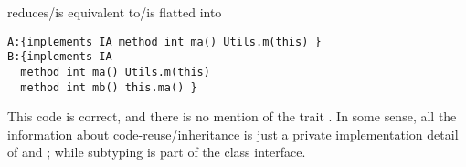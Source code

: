 \noindent reduces/is equivalent to/is flatted into
  
 \begin{lstlisting}
A:{implements IA method int ma() Utils.m(this) }
B:{implements IA
  method int ma() Utils.m(this)
  method int mb() this.ma() } 

 \end{lstlisting}
 
 This code is correct, and there is no mention of the trait
 \Q@ta@. In some sense, all the information about code-reuse/inheritance
  is just a private implementation detail of \Q@A@
 and \Q@B@; while subtyping is part of the class interface.






